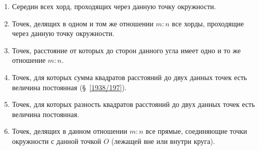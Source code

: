 \documentclass[oneside]{book}
\begin{document}
\begin{enumerate}[resume]

 \item
Середин всех хорд, проходящих через данную точку окружности.

 \item
Точек, делящих в одном и том же отношении $m:n$ все хорды, проходящие через данную точку окружности.

\item \label{1938/upr-3-17}
Точек, расстояние от которых до сторон данного угла имеет одно и то же отношение $m:n$.

 \item
Точек, для которых сумма квадратов расстояний до двух данных точек есть величина постоянная (§~\ref{1938/197}).

 \item
Точек, для которых разность квадратов расстояний до двух данных точек есть величина постоянная.

 \item
Точек, делящих в данном отношении $m:n$ все прямые, соединяющие точки окружности с данной точкой $O$ (лежащей вне или внутри круга).

\end{enumerate}

\begin{center}
\end{center}
\end{document}
